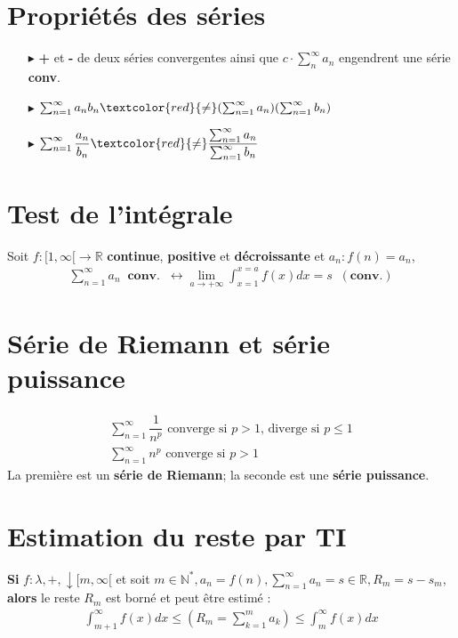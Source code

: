 \documentclass{report}
\begin{document}
\begin{multicols*}{3}
\begin{itemize}
    \end{itemize}



    \section{Propriétés des séries}
    \begin{itemize}
        \item[$\blacktriangleright$]  \textbf{+} et \textbf{-} de deux séries convergentes 
            ainsi que $c \cdot \sum_{n}^{\infty }a_n$ engendrent une série \textbf{conv}.
        \item[$\blacktriangleright$] 
            $\sum_{n=1}^{\infty}a_nb_n \textcolor{red}{\neq} 
            (\sum_{n=1}^{\infty}a_n)(\sum_{n=1}^{\infty}b_n)$
        \item[$\blacktriangleright$]
            $\sum_{n=1}^{\infty }\dfrac{a_n}{b_n} 
            \textcolor{red}{\neq} 
            \dfrac{\sum_{n=1}^{\infty}a_n}{\sum_{n=1}^{\infty}b_n}$
    \end{itemize}
    
    
    \section{Test de l'intégrale}
    Soit $f : [1, \infty [ \rightarrow \mathbb{R}$ 
    \textbf{continue}, \textbf{positive} et \textbf{décroissante} 
    et $a_n : f(n) = a_n$,
    \begin{align*}
        \sum_{n=1}^{\infty }a_n \;\; \textbf{conv.} \;\; \leftrightarrow
        \lim\limits_{a \to+\infty }\int_{x=1}^{x = a}f(x)dx = s \;\; (\textbf{conv.})    
    \end{align*}


    \section{Série de Riemann et série puissance} 
    \begin{align*}
        \sum_{n=1}^{\infty }\dfrac{1}{n^p} 
        \text{ converge si } p > 1 \text{, diverge si } p \leq 1
        \\
        \sum_{n=1}^{\infty}n^p \text{ converge  si }
         p > 1 
    \end{align*}
    La première est un \textbf{série de Riemann}; la seconde 
    est une \textbf{série puissance}.  


    
    \section{Estimation du reste par TI}
    \textbf{Si} $f: \lambda, + , \downarrow [m, \infty [$ et soit $m \in \mathbb{N}^*, 
     a_n = f(n), \sum_{n=1}^{\infty}a_n = s \in \mathbb{R}, 
     R_m = s - s_m$, \textbf{alors} le reste $R_m$ est borné et peut être 
     estimé :
     \begin{align*}
        \int_{m+1}^{\infty }f(x)dx \leq \left(R_m = \sum_{k=1}^{m} a_k\right) 
        \leq \int_{m}^{\infty }f(x)dx
     \end{align*}



\end{multicols*}
\end{document}
